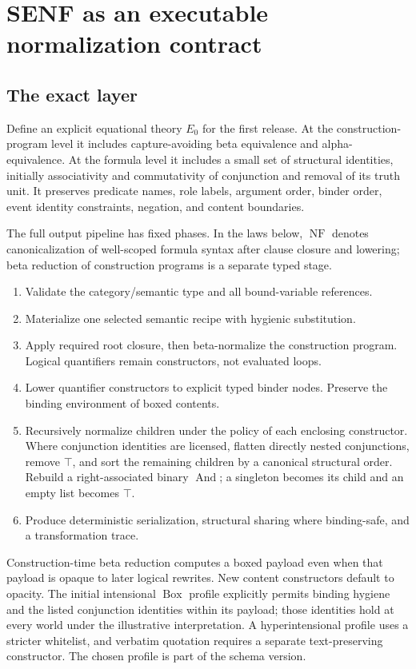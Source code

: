 \documentclass[11pt,a4paper]{article}
\newcommand{\Bx}{\operatorname{Box}}
\newcommand{\NF}{\operatorname{NF}}
\newcommand{\SAnd}{\operatorname{And}}
\begin{document}
\section{SENF as an executable normalization contract}\label{sec:normalization}

\subsection{The exact layer}
Define an explicit equational theory \(E_0\) for the first release.
At the construction-program level it includes capture-avoiding beta
equivalence and alpha-equivalence. At the formula level it includes a small
set of structural identities, initially associativity and commutativity of
conjunction and removal of its truth unit. It preserves predicate names, role
labels, argument order, binder order, event identity constraints, negation,
and content boundaries.

The full output pipeline has fixed phases. In the laws below, \(\NF\)
denotes canonicalization of well-scoped formula syntax after clause closure
and lowering; beta reduction of construction programs is a separate typed
stage.
\begin{enumerate}
  \item Validate the category/semantic type and all bound-variable references.
  \item Materialize one selected semantic recipe with hygienic substitution.
  \item Apply required root closure, then beta-normalize the construction
  program. Logical quantifiers remain constructors, not evaluated loops.
  \item Lower quantifier constructors to explicit typed binder nodes.
  Preserve the binding environment of boxed contents.
  \item Recursively normalize children under the policy of each enclosing
  constructor. Where conjunction identities are licensed, flatten directly
  nested conjunctions, remove \(\top\), and sort the remaining children by
  a canonical structural order. Rebuild a right-associated binary
  \(\SAnd\); a singleton becomes its child and an empty list becomes
  \(\top\).
  \item Produce deterministic serialization, structural sharing where
  binding-safe, and a transformation trace.
\end{enumerate}
Construction-time beta reduction computes a boxed payload even when that
payload is opaque to later logical rewrites. New content constructors default
to opacity. The initial intensional \(\Bx\) profile explicitly permits
binding hygiene and the listed conjunction identities within its payload;
those identities hold at every world under the illustrative interpretation.
A hyperintensional profile uses a stricter whitelist, and verbatim quotation
requires a separate text-preserving constructor. The chosen profile is part
of the schema version.
\end{document}
